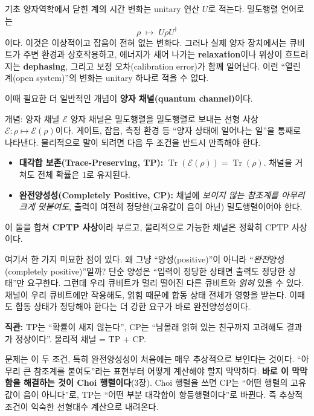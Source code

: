 \documentclass[11pt,a4paper]{article}
\newcommand{\E}{\mathcal{E}}
\newcommand{\Tr}{\operatorname{Tr}}
\begin{document}
기초 양자역학에서 닫힌 계의 시간 변화는 unitary 연산 $U$로 적는다. 밀도행렬 언어로는
\[
\rho \;\longmapsto\; U\rho U^\dagger
\]
이다. 이것은 이상적이고 잡음이 전혀 없는 변화다. 그러나 실제 양자 장치에서는 큐비트가 주변 환경과 상호작용하고, 에너지가 새어 나가는 \textbf{relaxation}이나 위상이 흐트러지는 \textbf{dephasing}, 그리고 보정 오차(calibration error)가 함께 일어난다. 이런 ``열린 계(open system)''의 변화는 unitary 하나로 적을 수 없다.

이때 필요한 더 일반적인 개념이 \textbf{양자 채널(quantum channel)}이다.

\begin{conceptbox}{개념: 양자 채널 $\E$}
양자 채널은 밀도행렬을 밀도행렬로 보내는 선형 사상 $\E:\rho\mapsto\E(\rho)$이다. 게이트, 잡음, 측정 환경 등 ``양자 상태에 일어나는 일''을 통째로 나타낸다. 물리적으로 말이 되려면 다음 두 조건을 반드시 만족해야 한다.
\begin{itemize}
  \item \textbf{대각합 보존(Trace-Preserving, TP):} $\Tr(\E(\rho))=\Tr(\rho)$. 채널을 거쳐도 전체 확률은 1로 유지된다.
  \item \textbf{완전양성성(Completely Positive, CP):} 채널에 \emph{보이지 않는 참조계를 아무리 크게 덧붙여도}, 출력이 여전히 정당한(고유값이 음이 아닌) 밀도행렬이어야 한다.
\end{itemize}
이 둘을 합쳐 \textbf{CPTP 사상}이라 부르고, 물리적으로 가능한 채널은 정확히 CPTP 사상이다.
\end{conceptbox}

여기서 한 가지 미묘한 점이 있다. 왜 그냥 ``양성(positive)''이 아니라 ``\emph{완전}양성(completely positive)''일까? 단순 양성은 ``입력이 정당한 상태면 출력도 정당한 상태''만 요구한다. 그런데 우리 큐비트가 멀리 떨어진 다른 큐비트와 \emph{얽혀} 있을 수 있다. 채널이 우리 큐비트에만 작용해도, 얽힘 때문에 합동 상태 전체가 영향을 받는다. 이때도 합동 상태가 정당해야 한다는 더 강한 요구가 바로 완전양성성이다.

\begin{intuitionbox}
\textbf{직관:} TP는 ``확률이 새지 않는다'', CP는 ``남몰래 얽혀 있는 친구까지 고려해도 결과가 정상이다''. 물리적 채널 = TP + CP.
\end{intuitionbox}

문제는 이 두 조건, 특히 완전양성성이 처음에는 매우 추상적으로 보인다는 것이다. ``아무리 큰 참조계를 붙여도''라는 표현부터 어떻게 계산해야 할지 막막하다. \textbf{바로 이 막막함을 해결하는 것이 Choi 행렬이다}(3장). Choi 행렬을 쓰면 CP는 ``어떤 행렬의 고유값이 음이 아니다''로, TP는 ``어떤 부분 대각합이 항등행렬이다''로 바뀐다. 즉 추상적 조건이 익숙한 선형대수 계산으로 내려온다.
\end{document}
